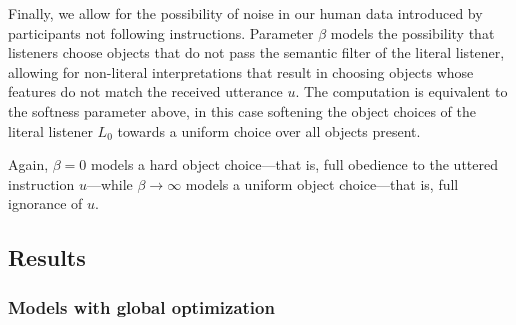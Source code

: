 \documentclass[11pt,a4paper]{article}
\begin{document}


Finally, we allow for the possibility of noise in our human data introduced by participants not following instructions.
Parameter $\beta$ models the possibility that listeners choose objects that do not pass the semantic filter of the literal listener, allowing for non-literal interpretations that result in choosing objects whose features do not match the received utterance $u$. 
The computation is equivalent to the softness parameter above, in this case softening the object choices of the literal listener $L_0$ towards a uniform choice over all objects present. 

Again, $\beta=0$ models a hard object choice---that is, full obedience to the uttered instruction $u$---while $\beta \rightarrow \infty$ models a uniform object choice---that is, full ignorance of $u$.

\subsection{Results}
\subsubsection{Models with global optimization}
\end{document}
